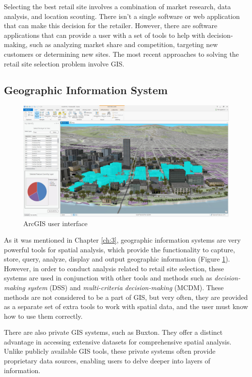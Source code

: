 Selecting the best retail site involves a combination of market research, data analysis, and location scouting. There isn't a single software or web application that can make this decision for the retailer. However, there are software applications that can provide a user with a set of tools to help with decision-making, such as analyzing market share and competition, targeting new customers or determining new sites. The most recent approaches to solving the retail site selection problem involve GIS.

\subsection{Geographic Information System}

\begin{figure}[ht]\centering
  \centering
  \includegraphics[width=0.75\linewidth]{obrazky-figures/ch4/arcgis-pro-3d.jpg}
  \caption{ArcGIS user interface}
  \label{fig:arc-gis}
\end{figure}

As it was mentioned in Chapter \ref{ch:3}, geographic information systems are very powerful tools for spatial analysis, which provide the functionality to capture, store, query, analyze, display and output geographic information (Figure \ref{fig:arc-gis}). However, in order to conduct analysis related to retail site selection, these systems are used in conjunction with other tools and methods such as \textit{decision-making system} (DSS) and \textit{multi-criteria decision-making} (MCDM). These methods are not considered to be a part of GIS, but very often, they are provided as a separate set of extra tools to work with spatial data, and the user must know how to use them correctly.

There are also private GIS systems, such as Buxton. They offer a distinct advantage in accessing extensive datasets for comprehensive spatial analysis. Unlike publicly available GIS tools, these private systems often provide proprietary data sources, enabling users to delve deeper into layers of information.

